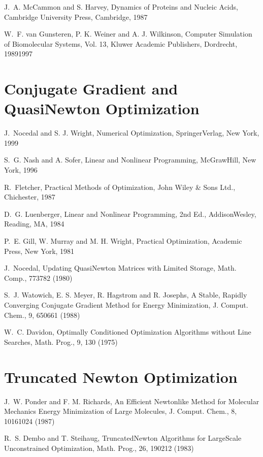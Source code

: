 \documentclass[letterpaper,11pt,english]{sphinxmanual}
\begin{document}
J. A. McCammon and S. Harvey, Dynamics of Proteins and Nucleic Acids, Cambridge University Press, Cambridge, 1987

W. F. van Gunsteren, P. K. Weiner and A. J. Wilkinson, Computer Simulation of Biomolecular Systems, Vol. 1\sphinxhyphen{}3, Kluwer Academic Publishers, Dordrecht, 1989\sphinxhyphen{}1997


\section{Conjugate Gradient and Quasi\sphinxhyphen{}Newton Optimization}
\label{\detokenize{text/references:conjugate-gradient-and-quasi-newton-optimization}}
J. Nocedal and S. J. Wright, Numerical Optimization, Springer\sphinxhyphen{}Verlag, New York, 1999

S. G. Nash and A. Sofer, Linear and Nonlinear Programming, McGraw\sphinxhyphen{}Hill, New York, 1996

R. Fletcher, Practical Methods of Optimization, John Wiley \& Sons Ltd., Chichester, 1987

D. G. Luenberger, Linear and Nonlinear Programming, 2nd Ed., Addison\sphinxhyphen{}Wesley, Reading, MA, 1984

P. E. Gill, W. Murray and M. H. Wright, Practical Optimization, Academic Press, New York, 1981

J. Nocedal, Updating Quasi\sphinxhyphen{}Newton Matrices with Limited Storage, Math. Comp., 773\sphinxhyphen{}782 (1980)

S. J. Watowich, E. S. Meyer, R. Hagstrom and R. Josephs, A Stable, Rapidly Converging Conjugate Gradient Method for Energy Minimization, J. Comput. Chem., 9, 650\sphinxhyphen{}661 (1988)

W. C. Davidon, Optimally Conditioned Optimization Algorithms without Line Searches, Math. Prog., 9, 1\sphinxhyphen{}30 (1975)


\section{Truncated Newton Optimization}
\label{\detokenize{text/references:truncated-newton-optimization}}
J. W. Ponder and F. M. Richards, An Efficient Newton\sphinxhyphen{}like Method for Molecular Mechanics Energy Minimization of Large Molecules, J. Comput. Chem., 8, 1016\sphinxhyphen{}1024 (1987)

R. S. Dembo and T. Steihaug, Truncated\sphinxhyphen{}Newton Algorithms for Large\sphinxhyphen{}Scale Unconstrained Optimization, Math. Prog., 26, 190\sphinxhyphen{}212 (1983)
\end{document}
